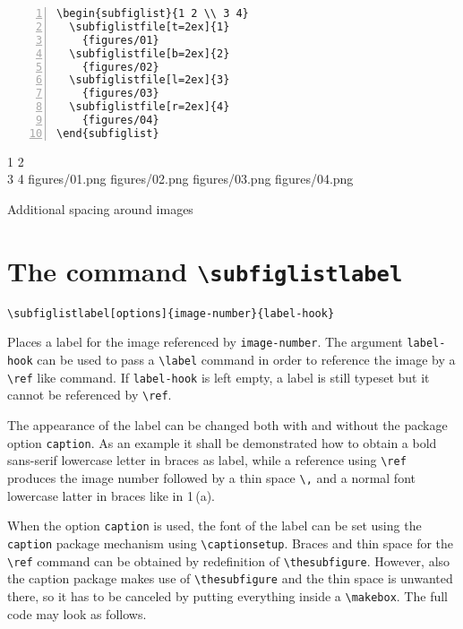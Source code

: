 \documentclass[version=3.12,american]{scrartcl}
\renewcommand*\thesubfigure{\,(\alph{subfigure})}
\begin{document}
\begin{listing}
\begin{minipage}{0.4\textwidth}
\begin{Verbatim}[numbers=left]
\begin{subfiglist}{1 2 \\ 3 4}
  \subfiglistfile[t=2ex]{1}
    {figures/01}
  \subfiglistfile[b=2ex]{2}
    {figures/02}
  \subfiglistfile[l=2ex]{3}
    {figures/03}
  \subfiglistfile[r=2ex]{4}
    {figures/04}
\end{subfiglist}
\end{Verbatim}
\end{minipage}
\hfill
\begin{minipage}{0.5\textwidth}
\begin{subfiglist}{1 2 \\ 3 4}
    {figures/01.png}
    {figures/02.png}
    {figures/03.png}
    {figures/04.png}
\end{subfiglist}
\end{minipage}
\caption{Additional spacing around images}
\label{lst:spacing}
\end{listing}

\section{The command \texttt{\textbackslash subfiglistlabel}}

\begin{verbatim}
\subfiglistlabel[options]{image-number}{label-hook}
\end{verbatim}

Places a label for the image referenced by \texttt{image-number}. The argument \texttt{label-hook} can be used to pass a \verb|\label| command in order to reference the image by a \verb|\ref| like command. If \texttt{label-hook} is left empty, a label is still typeset but it cannot be referenced by \verb|\ref|.

The appearance of the label can be changed both with and without the package option \texttt{caption}. As an example it shall be demonstrated how to obtain a bold sans-serif lowercase letter in braces as label, while a reference using \verb|\ref| produces the image number followed by a thin space \verb|\,| and a normal font lowercase latter in braces like in 1\,(a).

When the option \texttt{caption} is used, the font of the label can be set using the \texttt{caption} package mechanism using \verb|\captionsetup|. Braces and thin space for the \verb|\ref| command can be obtained by redefinition of \verb|\thesubfigure|. However, also the caption package makes use of \verb|\thesubfigure| and the thin space is unwanted there, so it has to be canceled by putting everything inside a \verb|\makebox|. The full code may look as follows.
\end{document}
